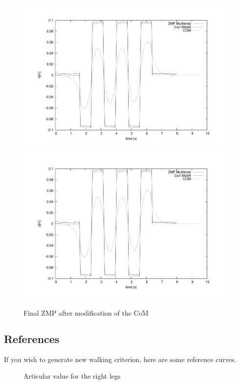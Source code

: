 \begin{figure}[htb]
\begin{center}
\includegraphics[width=\linewidth]{./figures/PatternGenerator/ThirdFigureZMPMB_X}
\includegraphics[width=\linewidth]{./figures/PatternGenerator/ThirdFigureZMPMB_Y}
\caption{Final ZMP after modification of the CoM}
\label{pic:ZMPMBcompensated}
\end{center}
\end{figure}
\clearpage

\subsection{References}
If you wish to generate new walking criterion, here are some reference curves.
\begin{figure}[htb]
\begin{center}
\caption{Articular value for the right legs}
\label{pic:ZMPMBcompensated}
\end{center}
\end{figure}

